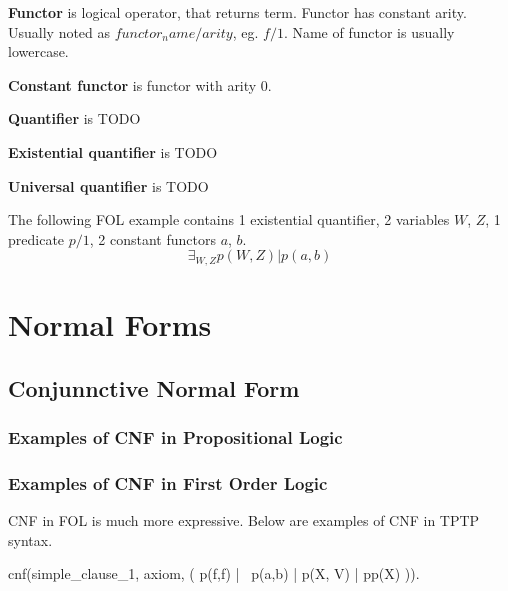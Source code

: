 \textbf{Functor}
is logical operator, that returns term. Functor has constant arity. Usually noted as $functor_name/arity$, eg. $f/1$. Name of functor  is usually lowercase.

\textbf{Constant functor}
is functor with arity 0.

\textbf{Quantifier}
is TODO

\textbf{Existential quantifier}
is TODO

\textbf{Universal quantifier}
is TODO

The following FOL example contains 1 existential quantifier, 2 variables $W$, $Z$, 1 predicate $p/1$, 2 constant functors $a$, $b$.
\begin{equation} \label{eg:FOL_1}
  \exists_{W,Z} p(W,Z) | p(a, b)
\end{equation}

\section{Normal Forms}

\subsection{Conjunnctive Normal Form}

\subsubsection{Examples of CNF in Propositional Logic}

\subsubsection{Examples of CNF in First Order Logic}

\gls{CNF} in \gls{FOL} is much more expressive. Below are examples of \gls{CNF} in \gls{TPTP} syntax.

\begin{tptpcode}
cnf(simple_clause_1, axiom,
    ( p(f,f) | ~p(a,b) | p(X, V) | pp(X) )).

\end{tptpcode}

